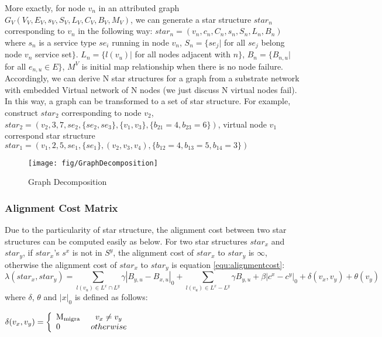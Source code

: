 More exactly, for node $v_n$ in an attributed graph  $G_V (V_V,E_V,s_V,S_V,L_V,C_V,B_V,M_V)$, we can generate a star structure $star_n$ corresponding to $v_n$ in the following way: $star_n=(v_n,c_n,C_n,s_n,S_n,L_n,B_n)$ where $s_n$ is a service type $se_i$ running in node $v_n$, $S_n=\{se_{j}|$ for all $se_j$ belong node $v_n$ service set$\}$.  $L_n=\{l(v_u)|$ for all nodes  adjacent with $n\}$, $B_n=\{B_{n,u}| $for all $e_{n,u}\in E\}$, $M^V$ is initial map relationship when there is no node failure. Accordingly, we can derive N star structures for a graph from a substrate network with embedded Virtual network of N nodes (we just discuss N virtual nodes fail). In this way, a graph can be transformed to a set of star structure. For example, construct $star_2$ corresponding to node $v_2$, $star_2=(v_2,3,7,se_2,\{se_2,se_3\},\{v_1,v_3\},\{b_{21}=4,b_{23}=6\})$, virtual node $v_1$ correspond star structure $star_1=(v_1,2,5,se_1,\{se_1\},(v_2,v_3,v_4),\{b_{12}=4,b_{13}=5,b_{14}=3\})$
\begin{figure}
\centering
\texttt{[image: fig/GraphDecomposition]}\\
\caption{Graph Decomposition}\label{fig:GraphDecomposition}
\end{figure}
\subsubsection{Alignment Cost Matrix}


Due to the particularity of star structure, the alignment cost between two star structures can be computed easily as below. For two star structures $star_x$ and $star_y$, if $star_x$'s $s^x$ is not in $S^y$, the alignment cost of $star_x$ to $star_y$ is $\infty$, otherwise the alignment cost of $star_x$ to $star_y$ is equation \ref{equ:alignmentcost}:
\begin{equation*}\label{equ:alignmentcost}
\lambda(star_x,star_y)=\sum\limits_{l(v_u)\in L^x \cap L^y}\gamma|B_{y,u}-B_{x,u}|_0+\sum\limits_{l(v_u)\in L^x - L^y}\gamma B_{y,u}+\beta|c^x-c^y|_0+ \delta(v_x,v_y)+\theta(v_y)
\end{equation*}
where $\delta$, $\theta$ and $|x|_0$ is defined as follows:

$\delta ({v_x},{v_y}) = \left\{ \begin{array}{l}
{\rm{M_{migra}}}\\
0
\end{array} \right.\begin{array}{*{20}{c}}
v_x\neq v_y\\
{otherwise}
\end{array}$

